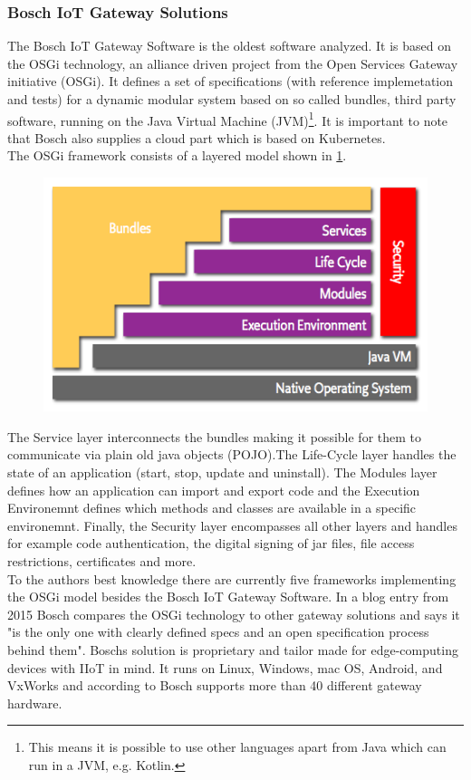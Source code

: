\subsubsection{Bosch IoT Gateway Solutions}
The Bosch IoT Gateway Software\cite{BoschIoT13:online} is the oldest software analyzed. It is based on the OSGi technology\cite{osgiDefintion25:online}, an alliance driven project from the Open Services Gateway initiative (OSGi). It defines a set of specifications (with reference implemetation and tests) for a dynamic modular system based on so called bundles, third party software, running on the Java Virtual Machine (JVM)\footnote{This means it is possible to use other languages apart from Java which can run in a JVM, e.g. Kotlin.}. It is important to note that Bosch also supplies a cloud part which is based on Kubernetes.\\
The OSGi framework consists of a layered model shown in \cref{fig:osgiLayerModel}. 
\begin{figure}[!ht]
    \centering
    \includegraphics[scale=0.8]{figures/layering-osgi.png}
    \label{fig:osgiLayerModel}
\end{figure}
The Service layer interconnects the bundles making it possible for them to communicate via plain old java objects (POJO).The Life-Cycle layer handles the state of an application (start, stop, update and uninstall). The Modules layer defines how an application can import and export code and the Execution Environemnt defines which methods and classes are available in a specific environemnt. Finally, the Security layer encompasses all other layers and handles for example code authentication, the digital signing of jar files, file access restrictions, certificates and more.\\
To the authors best knowledge there are currently five frameworks implementing the OSGi model besides the Bosch IoT Gateway Software\cite{BoschIoT13:online}. In a blog entry from 2015 Bosch compares the OSGi technology to other gateway solutions and says it "is the only one with clearly defined specs and an open specification process behind them"\cite{boschBlogOSGi69:online}. Boschs solution is proprietary and tailor made for edge-computing devices with IIoT in mind\cite{OSGiforIoTBlog27:online}. It runs on Linux, Windows, mac OS, Android, and VxWorks and according to Bosch supports more than 40 different gateway hardware\cite{BoschIoT13:online}. 


